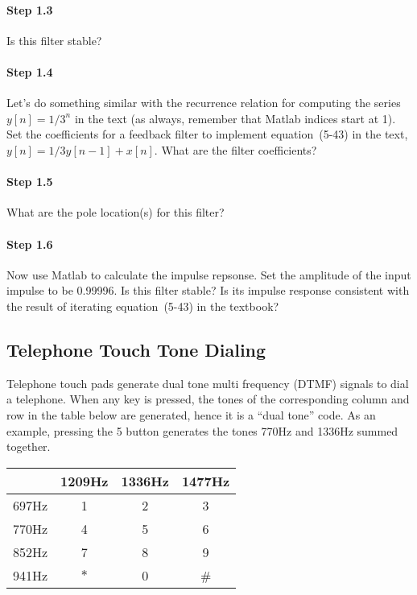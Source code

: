 \paragraph{Step 1.3} Is this filter stable?


\paragraph{Step 1.4} Let's do something similar with the recurrence
relation for computing the series $y[n] = 1/3^n$ in the text (as
always, remember that Matlab indices start at 1). Set the
coefficients for a feedback filter to implement equation~(5-43) in the
text, $y[n] = 1/3 y[n-1] + x[n]$. What are the filter coefficients?


\paragraph{Step 1.5} What are the pole location(s) for this filter?


\paragraph{Step 1.6} Now use Matlab to calculate the impulse repsonse.
Set the amplitude of the input impulse to be 0.99996. Is this filter
stable?  Is its impulse response consistent with the result of
iterating equation~(5-43) in the textbook?


\subsection{Telephone Touch Tone Dialing}
Telephone touch pads generate dual tone multi frequency (DTMF) signals
to dial a telephone. When any key is pressed, the tones of the
corresponding column and row in the table below are generated, hence
it is a ``dual tone'' code. As an example, pressing the 5 button
generates the tones 770Hz and 1336Hz summed together.

\begin{center}
  \begin{tabular}{l|ccc}
    & 1209Hz & 1336Hz & 1477Hz \\ \hline
    697Hz &   1    &   2    &   3    \\
    770Hz &   4    &   5    &   6    \\
    852Hz &   7    &   8    &   9    \\
    941Hz &   $\ast $    &   0    &   \#    
  \end{tabular}
\end{center}

